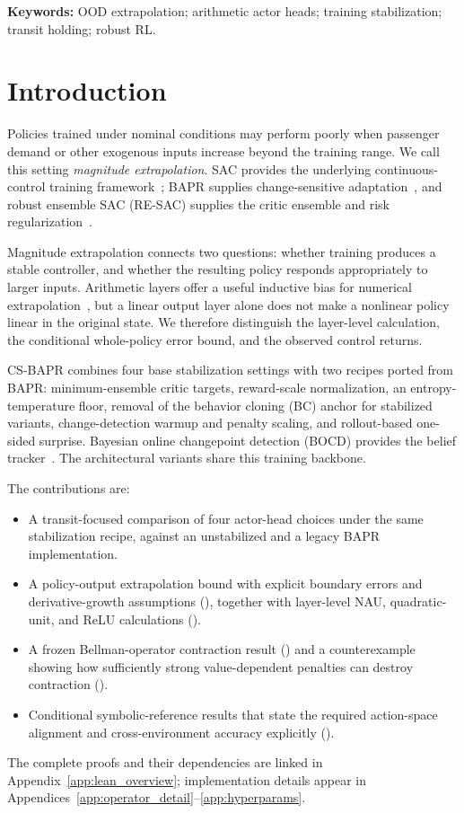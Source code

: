 \documentclass[10pt]{article}
\begin{document}
\noindent\textbf{Keywords:} OOD extrapolation; arithmetic actor heads; training stabilization; transit holding; robust RL.

\section{Introduction}

Policies trained under nominal conditions may perform poorly when passenger demand or other exogenous inputs increase beyond the training range. We call this setting \emph{magnitude extrapolation}. SAC provides the underlying continuous-control training framework~\cite{Haarnoja2018SAC}; BAPR supplies change-sensitive adaptation~\cite{Zhang2025BAPR}, and robust ensemble SAC (RE-SAC) supplies the critic ensemble and risk regularization~\cite{Zhang2025RESAC}.

Magnitude extrapolation connects two questions: whether training produces a stable controller, and whether the resulting policy responds appropriately to larger inputs. Arithmetic layers offer a useful inductive bias for numerical extrapolation~\cite{Trask2018NALU,Madsen2020NAU}, but a linear output layer alone does not make a nonlinear policy linear in the original state. We therefore distinguish the layer-level calculation, the conditional whole-policy error bound, and the observed control returns.

CS-BAPR combines four base stabilization settings with two recipes ported from BAPR: minimum-ensemble critic targets, reward-scale normalization, an entropy-temperature floor, removal of the behavior cloning (BC) anchor for stabilized variants, change-detection warmup and penalty scaling, and rollout-based one-sided surprise. Bayesian online changepoint detection (BOCD) provides the belief tracker~\cite{Adams2007BOCD}. The architectural variants share this training backbone.

The contributions are:
\begin{itemize}
    \item A transit-focused comparison of four actor-head choices under the same stabilization recipe, against an unstabilized and a legacy BAPR implementation.
    \item A policy-output extrapolation bound with explicit boundary errors and derivative-growth assumptions (), together with layer-level NAU, quadratic-unit, and ReLU calculations ().
    \item A frozen Bellman-operator contraction result () and a counterexample showing how sufficiently strong value-dependent penalties can destroy contraction ().
    \item Conditional symbolic-reference results that state the required action-space alignment and cross-environment accuracy explicitly ().
\end{itemize}
The complete proofs and their dependencies are linked in Appendix~\ref{app:lean_overview}; implementation details appear in Appendices~\ref{app:operator_detail}--\ref{app:hyperparams}.
\end{document}
